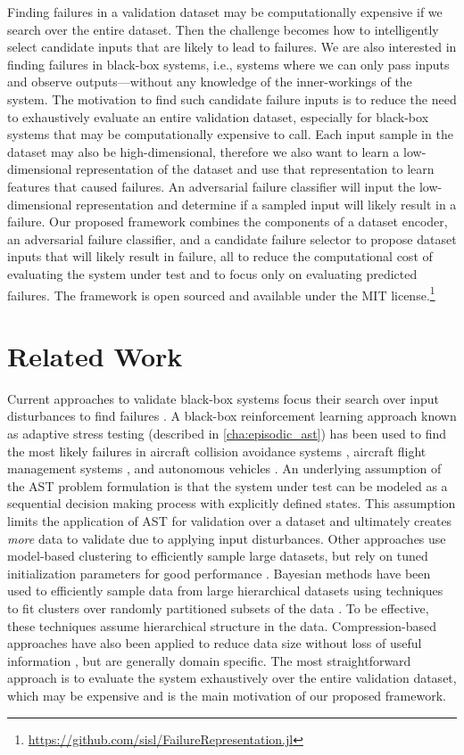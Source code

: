 Finding failures in a validation dataset may be computationally expensive if we search over the entire dataset.
Then the challenge becomes how to intelligently select candidate inputs that are likely to lead to failures.
We are also interested in finding failures in black-box systems, i.e., systems where we can only pass inputs and observe outputs---without any knowledge of the inner-workings of the system.
The motivation to find such candidate failure inputs is to reduce the need to exhaustively evaluate an entire validation dataset, especially for black-box systems that may be computationally expensive to call.
Each input sample in the dataset may also be high-dimensional, therefore we also want to learn a low-dimensional representation of the dataset and use that representation to learn features that caused failures.
An adversarial failure classifier will input the low-dimensional representation and determine if a sampled input will likely result in a failure.
Our proposed framework combines the components of a dataset encoder, an adversarial failure classifier, and a candidate failure selector to propose dataset inputs that will likely result in failure, all to reduce the computational cost of evaluating the system under test and to focus only on evaluating predicted failures.
The framework is open sourced and available under the MIT license.\footnote{\url{https://github.com/sisl/FailureRepresentation.jl}}

\section{Related Work}
Current approaches to validate black-box systems focus their search over input disturbances to find failures \citep{corso2020survey}.
A black-box reinforcement learning approach known as adaptive stress testing (described in \cref{cha:episodic_ast}) has been used to find the most likely failures in aircraft collision avoidance systems \citep{lee2015adaptive, lee2020adaptive}, aircraft flight management systems \citep{moss2020adaptive}, and autonomous vehicles \citep{koren2018adaptive, koren2019efficient}.
An underlying assumption of the AST problem formulation is that the system under test can be modeled as a sequential decision making process with explicitly defined states.
This assumption limits the application of AST for validation over a dataset and ultimately creates \textit{more} data to validate due to applying input disturbances.
Other approaches use model-based clustering to efficiently sample large datasets, but rely on tuned initialization parameters for good performance \citep{wehrens2004model}.
Bayesian methods have been used to efficiently sample data from large hierarchical datasets using techniques to fit clusters over randomly partitioned subsets of the data \citep{huang2005sampling}.
To be effective, these techniques assume hierarchical structure in the data. 
Compression-based approaches have also been applied to reduce data size without loss of useful information \citep{ferrari2013handling}, but are generally domain specific.
The most straightforward approach is to evaluate the system exhaustively over the entire validation dataset, which may be expensive and is the main motivation of our proposed framework.




